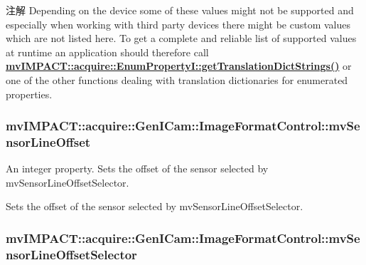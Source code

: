 \begin{DoxyNote}{注解}
Depending on the device some of these values might not be supported and especially when working with third party devices there might be custom values which are not listed here. To get a complete and reliable list of supported values at runtime an application should therefore call {\bfseries \hyperlink{classmv_i_m_p_a_c_t_1_1acquire_1_1_enum_property_i_a0ba6ccbf5ee69784d5d0b537924d26b6}{mv\+I\+M\+P\+A\+C\+T\+::acquire\+::\+Enum\+Property\+I\+::get\+Translation\+Dict\+Strings()}} or one of the other functions dealing with translation dictionaries for enumerated properties. 
\end{DoxyNote}
\hypertarget{classmv_i_m_p_a_c_t_1_1acquire_1_1_gen_i_cam_1_1_image_format_control_a0dd5e96d70d8a3c73ce5ca9c6a1e09c9}{
\subsubsection[{mv\+Sensor\+Line\+Offset}]{ mv\+I\+M\+P\+A\+C\+T\+::acquire\+::\+Gen\+I\+Cam\+::\+Image\+Format\+Control\+::mv\+Sensor\+Line\+Offset}}\label{classmv_i_m_p_a_c_t_1_1acquire_1_1_gen_i_cam_1_1_image_format_control_a0dd5e96d70d8a3c73ce5ca9c6a1e09c9}


An integer property. Sets the offset of the sensor selected by mv\+Sensor\+Line\+Offset\+Selector. 

Sets the offset of the sensor selected by mv\+Sensor\+Line\+Offset\+Selector. \hypertarget{classmv_i_m_p_a_c_t_1_1acquire_1_1_gen_i_cam_1_1_image_format_control_a370dcf48c65b4970b4f22856fc7c5094}{
\subsubsection[{mv\+Sensor\+Line\+Offset\+Selector}]{ mv\+I\+M\+P\+A\+C\+T\+::acquire\+::\+Gen\+I\+Cam\+::\+Image\+Format\+Control\+::mv\+Sensor\+Line\+Offset\+Selector}}\label{classmv_i_m_p_a_c_t_1_1acquire_1_1_gen_i_cam_1_1_image_format_control_a370dcf48c65b4970b4f22856fc7c5094}


